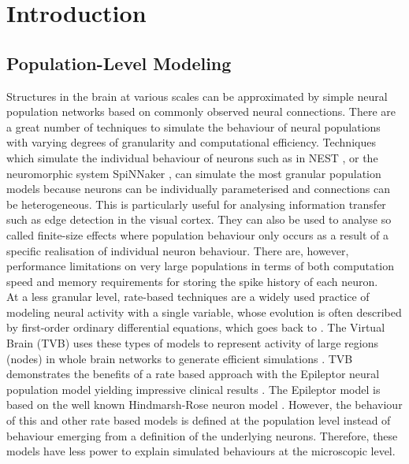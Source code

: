\documentclass[utf8]{frontiersSCNS} %
\begin{document}
\section{Introduction}

\subsection{Population-Level Modeling}
Structures in the brain at various scales can be approximated by simple neural population networks based on commonly observed neural connections. There are a great number of techniques to simulate the behaviour of neural populations with varying degrees of granularity and computational efficiency. 
Techniques which simulate the individual behaviour of neurons such as in NEST \citep{Gewaltig:NEST}, or the neuromorphic system SpiNNaker \citep{9fed179f612a405b8801b67ef74bc737}, can simulate the most granular population models because neurons can be individually parameterised and connections can be heterogeneous. This is particularly useful for analysing information transfer such as edge detection in the visual cortex. They can also be used to analyse so called finite-size effects where population behaviour only occurs as a result of a specific realisation of individual neuron behaviour. There are, however, performance limitations on very large populations in terms of both computation speed and memory requirements for storing the spike history of each neuron. \\

At a less granular level, rate-based techniques are a widely used practice of modeling neural activity with a single variable, whose evolution is often described by first-order ordinary differential equations, which goes back to \cite{wilson1972excitatory}. The Virtual Brain (TVB) uses these types of models to represent activity of large regions (nodes) in whole brain networks to generate efficient simulations \citep{sanz2013virtual,jirsa2014nature}. TVB demonstrates the benefits of a rate based approach with the Epileptor neural population model yielding impressive clinical results \citep{proix2017individual}. The Epileptor model is based on the well known Hindmarsh-Rose neuron model \citep{hindmarsh1984model}. However, the behaviour of this and other rate based models is defined at the population level instead of behaviour emerging from a definition of the underlying neurons. Therefore, these models have less power to explain simulated behaviours at the microscopic level.\\
\end{document}
